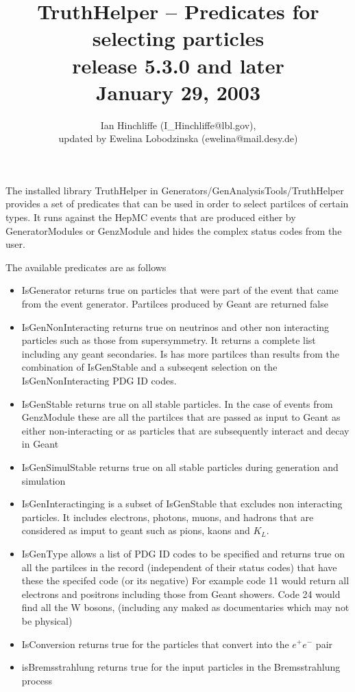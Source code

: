 \documentclass[11pt]{article}
\begin{document}
\title{TruthHelper -- Predicates for selecting particles\\
release 5.3.0 and later\\ 
January 29, 2003}
\author{ Ian Hinchliffe (I\_Hinchliffe@lbl.gov),\\
         updated by Ewelina Lobodzinska (ewelina@mail.desy.de)}

\maketitle   

The installed library   TruthHelper in
Generators/GenAnalysisTools/TruthHelper
 provides a set of predicates that can be used in order to select
 partilces of certain types. It runs against the HepMC events that are
 produced either by GeneratorModules or GenzModule and hides the
 complex status codes from the user.

The available predicates are as follows


\begin{itemize}
\item IsGenerator  returns true on particles that were part of the
  event that came from the event generator. Partilces produced by
  Geant are returned false
\item IsGenNonInteracting returns true on neutrinos and other non
  interacting particles such as those from supersymmetry. It returns a
  complete list including any geant secondaries. Is has more partilces
  than results from the combination of IsGenStable and a subseqent
  selection on the IsGenNonInteracting PDG ID codes.
\item IsGenStable returns  true on all stable particles. In the case of events
  from GenzModule these are all the partilces that are passed as input
  to Geant as either non-interacting or as particles that are
  subsequently interact and decay in Geant
\item IsGenSimulStable returns true on all stable particles during generation and simulation
\item IsGenInteractinging is a subset of IsGenStable that excludes non
  interacting particles. It includes electrons, photons, muons, and
  hadrons that are considered as imput to geant such as pions, kaons
  and $K_L$.
\item IsGenType allows a list of PDG ID codes to be specified and
  returns true on all the partilces in the record (independent of
  their status codes) that have these the specifed code (or its
  negative) For example code 11 would return all electrons  and
  positrons including
  those from Geant showers. Code 24 would find all the W bosons,
  (including any maked as documentaries which may not be physical)
\item IsConversion returns true for the particles that convert into the $e^+e^-$ pair
\item isBremsstrahlung returns true for the input particles in the Bremsstrahlung process
\end{itemize}
\end{document}
